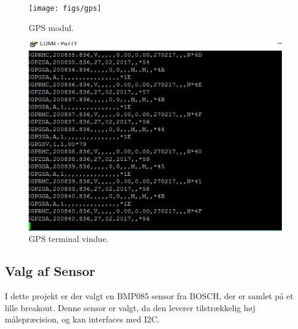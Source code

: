 \begin{figure}
	\centering
	\texttt{[image: figs/gps]}
	\caption{GPS modul.}
	\label{fig:gps}
\end{figure}

\begin{figure}
	\centering
	\includegraphics[width=0.7\linewidth]{figs/gps_terminal}
	\caption{GPS terminal vindue.}
	\label{fig:gps_terminal}
\end{figure}

\subsection{Valg af Sensor}
I dette projekt er der valgt en BMP085 sensor fra BOSCH, der er samlet på et lille breakout. Denne sensor er valgt, da den leverer tilstrækkelig høj målepræcision, og 
kan interfaces med I2C.
